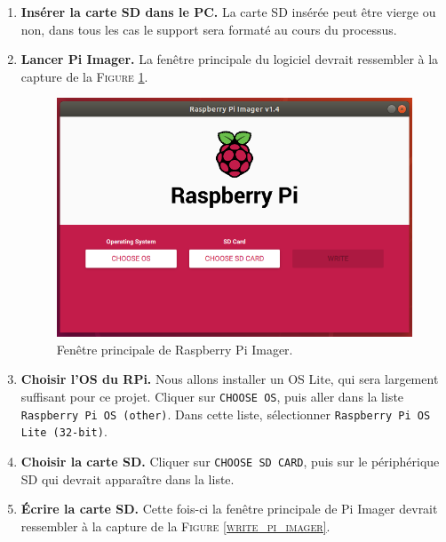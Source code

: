 \documentclass[a4paper, 10pt]{article}
\begin{document}
\begin{enumerate}
	\item\textbf{Insérer la carte SD dans le PC.} La carte SD insérée peut
	être vierge ou non, dans tous les cas le support sera formaté au cours
	du processus. 
	
	\item\textbf{Lancer Pi Imager.} La fenêtre principale du logiciel 
	devrait ressembler à la capture de la \textsc{Figure \ref{sc_pi_imager}}.
	
	\begin{figure}[h]
		\centering
		\includegraphics[scale=0.4]{fig/sc_pi_imager.png}
		\caption{Fenêtre principale de Raspberry Pi Imager.}
		\label{sc_pi_imager}
	\end{figure}

	\item\textbf{Choisir l'OS du RPi.} Nous allons installer un OS Lite,
	qui sera largement suffisant pour ce projet. Cliquer sur \texttt{CHOOSE OS}, 
	puis aller dans la liste \texttt{Raspberry Pi OS (other)}. 
	Dans cette liste, sélectionner \texttt{Raspberry Pi OS Lite (32-bit)}.
	
	\item\textbf{Choisir la carte SD.} Cliquer sur \texttt{CHOOSE SD CARD}, puis
	sur le périphérique SD qui devrait apparaître dans la liste.
	
	\item\textbf{Écrire la carte SD.} Cette fois-ci la fenêtre principale de 
	Pi Imager devrait ressembler à la capture de la \textsc{Figure \ref{write_pi_imager}}.
	

\end{enumerate}
\end{document}
